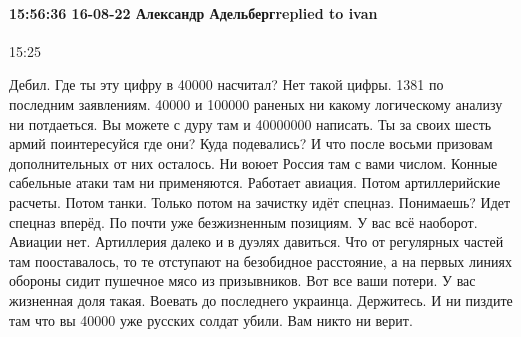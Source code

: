  
 
 
 
 

\paragraph{15:56:36 16-08-22 Александр Адельбергreplied to ivan}

15:25

Дебил. Где ты эту цифру в 40000 насчитал? Нет такой цифры. 1381 по последним заявлениям. 40000 и 100000 раненых ни какому логическому анализу ни потдаеться. Вы можете с дуру там и 40000000 написать. Ты за своих шесть армий поинтересуйся где они? Куда подевались? И что после восьми призовам дополнительных от них осталось.
Ни воюет Россия там с вами числом. Конные сабельные атаки там ни применяются. Работает авиация. Потом артиллерийские расчеты. Потом танки. Только потом на зачистку идёт спецназ. Понимаешь? Идет спецназ вперёд.
По почти уже безжизненным позициям.
У вас всё наоборот.
Авиации нет. Артиллерия далеко и в дуэлях давиться. Что от регулярных частей там пооставалось, то те отступают на безобидное расстояние, а на первых линиях обороны сидит пушечное мясо из призывников. Вот все ваши потери. У вас жизненная доля такая. Воевать до последнего украинца. Держитесь. И ни пиздите там что вы 40000 уже русских солдат убили. Вам никто ни верит.
